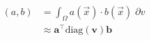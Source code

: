 \begin{equation}
\begin{aligned}
\left(a,b\right)
&= \int_{\Omega}{a(\vec{x}) \cdot b(\vec{x})} \; {\partial v} \\
&\approx \mathbf{a}^\top \text{diag} \left( \mathbf{v} \right) \mathbf{b}
\end{aligned}
\end{equation}
